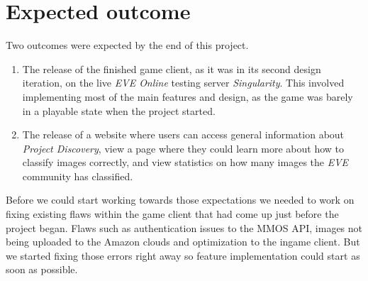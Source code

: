 \section{Expected outcome}\label{sec:expected_outcome}

Two outcomes were expected by the end of this project.

\begin{enumerate}
	\item{The release of the finished game client, as it was in its second design iteration, on the live \emph{EVE Online} testing server \emph{Singularity}. This involved implementing most of the main features and design, as the game was barely in a playable state when the project started.}
	\item{The release of a website where users can access general information about \emph{Project Discovery}, view a page where they could learn more about how to classify images correctly, and view statistics on how many images the \emph{EVE} community has classified. }
\end{enumerate}

Before we could start working towards those expectations we needed to work on fixing existing flaws within the game client that had come up just before the project began. Flaws such as authentication issues to the MMOS API, images not being uploaded to the Amazon clouds and optimization to the ingame client. But we started fixing those errors right away so feature implementation could start as soon as possible.

